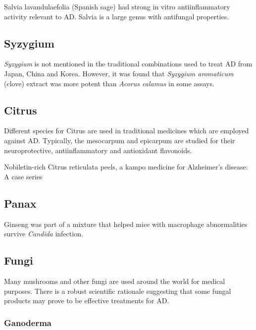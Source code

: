 \documentclass[twocolumn]{article}
\begin{document}
Salvia lavandulaefolia (Spanish sage)
had strong in vitro antiinflammatory activity relevant to AD.
\cite{perry2001vitro}
Salvia is a large genus with antifungal properties.
\cite{yuce2014essential, tabanca2006chemical}



\subsection{Syzygium}

\textit{Syzygium} is not mentioned in the traditional combinations
used to treat AD
from Japan, China and Korea.
However, it was found that \textit{Syzygium aromaticum} (clove)
extract was more potent than \textit{Acorus calamus}
in some assays.
\cite{ขจร2001fungistatic}




\subsection{Citrus}

Different species for Citrus are used in traditional medicines
which are employed against AD.
Typically, the mesocarpum and epicarpum
are studied for their neuroprotective, antiinflammatory and antioxidant
flavonoids.
\cite{?}

Nobiletin-rich Citrus reticulata peels,
a kampo medicine for Alzheimer's disease: A case series
\cite{seki2013nobiletin}


\subsection{Panax}

Ginseng was part of a mixture that
helped mice with macrophage abnormalities
survive \textit{Candida} infection.
\cite{akagawa1996protection}


\subsection{Fungi}

Many mushrooms and other fungi are used around the world for medical purposes.
There is a robust scientific rationale suggesting that some
fungal products may prove to be effective treatments for AD.

\subsubsection{Ganoderma}
\end{document}
